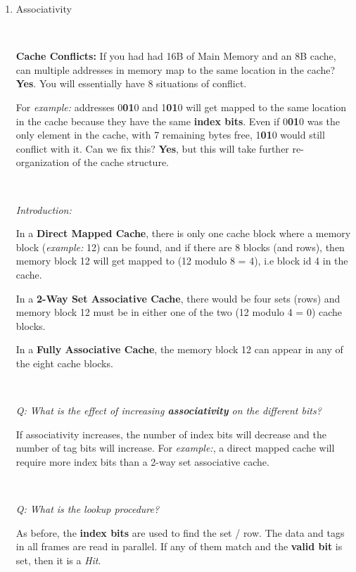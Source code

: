 \documentclass[12pt]{article}
\newenvironment{QandA}{\begin{enumerate}[label=\bfseries\arabic*.]\bfseries}
                      {\end{enumerate}}
\newenvironment{answered}{\par\quad\normalfont}{}
\begin{document}
\begin{QandA}
\begin{answered}
\end{answered}

\ 

\item Associativity

\ 

\begin{answered}
\textbf{Cache Conflicts:} If you had had 16B of Main Memory and an 8B cache, can multiple addresses in memory map to the same location in the cache? \textbf{Yes}. You will essentially have 8 situations of conflict.

For \textit{example:} addresses 0\textbf{01}0 and 1\textbf{01}0 will get mapped to the same location in the cache because they have the same \textbf{index bits}. Even if 0\textbf{01}0 was the only element in the cache, with 7 remaining bytes free, 1\textbf{01}0 would still conflict with it. Can we fix this? \textbf{Yes}, but this will take further re-organization of the cache structure.

\ 

\textit{Introduction:}

In a \textbf{Direct Mapped Cache}, there is only one cache block where a memory block (\textit{example:} 12) can be found, and if there are 8 blocks (and rows), then memory block 12 will get mapped to (12 modulo 8 = 4), i.e block id 4 in the cache. 

In a \textbf{2-Way Set Associative Cache}, there would be four sets (rows) and memory block 12 must be in either one of the two (12 modulo 4 = 0) cache blocks. 

In a \textbf{Fully Associative Cache}, the memory block 12 can appear in any of the eight cache blocks. 

\

\textit{Q: What is the effect of increasing \textbf{associativity} on the different bits?}

\quad If associativity increases, the number of index bits will decrease and the number of tag bits will increase. For \textit{example:}, a direct mapped cache will require more index bits than a 2-way set associative cache. 

\ 

\textit{Q: What is the lookup procedure?}

\quad As before, the \textbf{index bits} are used to find the set / row. The data and tags in all frames are read in parallel. If any of them match and the \textbf{valid bit} is set, then it is a \textit{Hit}. 

\


\end{answered}
\end{QandA}
\end{document}
